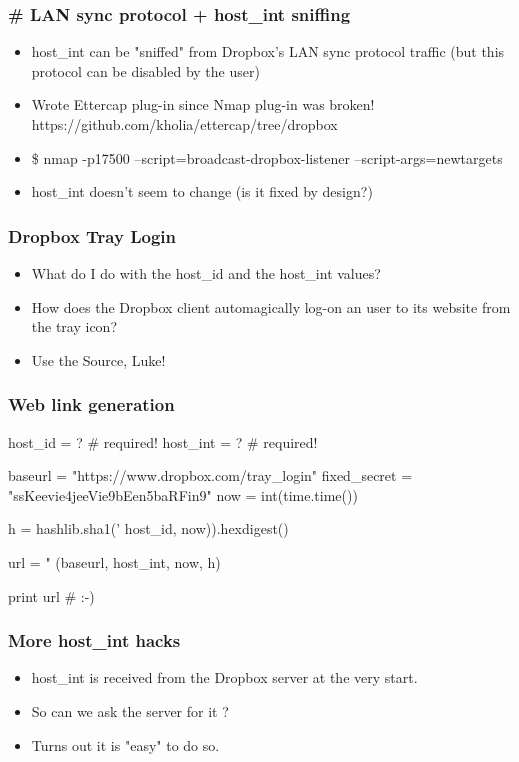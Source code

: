 \documentclass{beamer}
\newcommand\myfont{\fontsize{14}{20}\selectfont}
\begin{document}
\begin{frame}
\frametitle{\# LAN sync protocol + host\_int sniffing}
\begin{itemize}
\itemsep 2em
\item host\_int can be "sniffed" from Dropbox's LAN sync protocol traffic (but this protocol can be disabled by the user)
\item Wrote Ettercap plug-in since Nmap plug-in was broken! \\
  \vspace{1em} https://github.com/kholia/ettercap/tree/dropbox
\item \$ nmap -p17500 --script=broadcast-dropbox-listener --script-args=newtargets
\item host\_int doesn't seem to change (is it fixed by design?)
\end{itemize}
\end{frame}

\begin{frame}
\frametitle{Dropbox Tray Login}
\myfont
\begin{itemize}
\itemsep 2em
\item What do I do with the host\_id and the host\_int values?
\item How does the Dropbox client automagically log-on an user to its website from the tray icon?
\item Use the Source, Luke!
\end{itemize}
\end{frame}

\begin{frame}[fragile]
\frametitle{Web link generation}
\begin{python}
host_id = ?   # required!
host_int = ?  # required!

baseurl = "https://www.dropbox.com/tray_login"
fixed_secret = "ssKeevie4jeeVie9bEen5baRFin9"
now = int(time.time())

h = hashlib.sha1('%
       host_id, now)).hexdigest()

url = "%
        (baseurl, host_int, now, h)

print url # :-)
\end{python}
\end{frame}

\begin{frame}
\frametitle{More host\_int hacks}
\myfont
\begin{itemize}
\itemsep 2em
\item host\_int is received from the Dropbox server at the very start.

\item So can we ask the server for it ?

\item Turns out it is "easy" to do so.
\end{itemize}
\end{frame}
\end{document}

